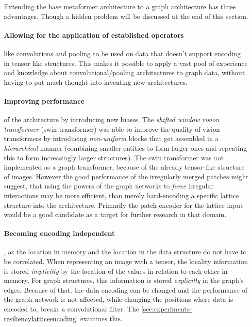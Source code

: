 Extending the base metaformer architecture to a graph architecture has three advantages. 
Though a hidden problem will be discussed at the end of this section.

\paragraph{Allowing for the application of established operators} like convolutions and pooling to be used on data that doesn't support encoding in tensor like structures. 
This makes it possible to apply a vast pool of experience and knowledge about convolutional/pooling architectures to graph data, without having to put much thought into inventing new architectures.

\paragraph{Improving performance} of the architecture by introducing new biases.
The \emph{shifted window vision transformer} (swin transformer) \cite{swinTransformerPaper} was able to improve the quality of vision transformers by introducing \emph{non-uniform} blocks that get assembled in a \emph{hierarchical} manner (combining smaller entities to form larger ones and repeating this to form increasingly larger structures).
The swin transformer was not implemented as a graph transformer, because of the already tensor-like structure of images. 
However the good performance of the irregularly merged patches might suggest, that using the powers of the graph networks to \emph{force} irregular interactions may be more efficient, than merely hard-encoding a specific lattice structure into the architecture.
Primarily the patch encoder for the lattice input would be a good candidate as a target for further research in that domain.

\paragraph{Becoming encoding independent}, as the location in memory and the location in the data structure do not have to be correlated. 
When representing an image with a tensor, the locality information is stored \emph{implicitly} by the location of the values in relation to each other in memory. 
For graph structures, this information is stored \emph{explicitly} in the graph's edges.
Because of that, the data encoding can be changed and the performance of the graph network is not affected, while changing the positions where data is encoded to, breaks a convolutional filter.
The \autoref{sec:experiments-resiliencylatticeencoding} examines this.\\

